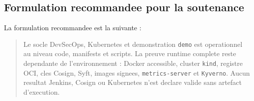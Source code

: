 \subsection{Formulation recommandee pour la soutenance}

La formulation recommandee est la suivante :

\begin{quote}
Le socle DevSecOps, Kubernetes et demonstration \texttt{demo} est operationnel
au niveau code, manifests et scripts. La preuve runtime complete reste
dependante de l'environnement : Docker accessible, cluster \texttt{kind},
registre OCI, cles Cosign, Syft, images signees, \texttt{metrics-server} et
\texttt{Kyverno}. Aucun resultat Jenkins, Cosign ou Kubernetes n'est declare
valide sans artefact d'execution.
\end{quote}
